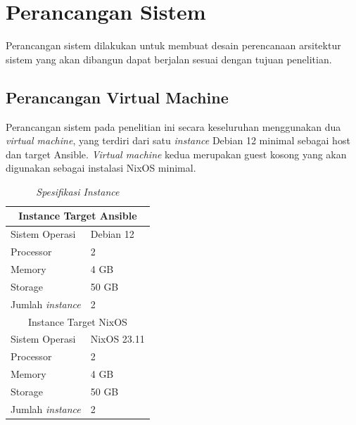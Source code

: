 \documentclass[10pt,]{report}
\begin{document}
\section{Perancangan Sistem}
\vspace{-3mm}
\begin{adjustwidth}{7mm}{}
	Perancangan sistem dilakukan untuk membuat desain perencanaan arsitektur
	sistem yang akan dibangun dapat berjalan sesuai dengan tujuan penelitian.
	\subsection{Perancangan Virtual Machine}
	\begin{adjustwidth}{6mm}{}
		Perancangan sistem pada penelitian ini secara keseluruhan menggunakan dua
		\textit{virtual machine}, yang terdiri dari satu \textit{instance} Debian
		12 minimal sebagai host dan target Ansible. \textit{Virtual machine} kedua
		merupakan guest kosong yang akan digunakan sebagai instalasi NixOS minimal.
	\end{adjustwidth}
	\begin{table}[!htbp]
		\caption{\textit{Spesifikasi Instance}}
		\begin{center}

			\begin{tabular}{|l|l|}
				\hline
				\multicolumn{2}{|c|}{Instance Target Ansible} \\
				\hline
				Sistem Operasi           & Debian 12          \\
				\hline
				Processor                & 2                  \\
				\hline
				Memory                   & 4 GB               \\
				\hline
				Storage                  & 50 GB              \\
				\hline
				Jumlah \textit{instance} & 2                  \\
				\hline
				\multicolumn{2}{|c|}{Instance Target NixOS}   \\
				\hline
				Sistem Operasi           & NixOS 23.11        \\
				\hline
				Processor                & 2                  \\
				\hline
				Memory                   & 4 GB               \\
				\hline
				Storage                  & 50 GB              \\
				\hline
				Jumlah \textit{instance} & 2                  \\
				\hline
			\end{tabular}
		\end{center}
	\end{table}

\end{adjustwidth}
\end{document}
